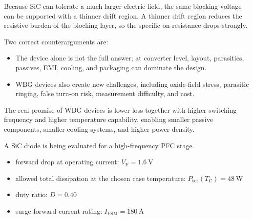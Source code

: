 \begin{solutionblock}
Because SiC can tolerate a much larger electric field, the same blocking voltage can be supported with a thinner drift region. A thinner drift region reduces the resistive burden of the blocking layer, so the specific on-resistance drops strongly.
\end{solutionblock}

\begin{solutionblock}
Two correct counterarguments are:
\begin{itemize}   
    \item The device alone is not the full answer; at converter level, layout, parasitics, passives, EMI, cooling, and packaging can dominate the design.
    \item WBG devices also create new challenges, including oxide-field stress, parasitic ringing, false turn-on risk, measurement difficulty, and cost.
\end{itemize}
\end{solutionblock}

\begin{solutionblock}
The real promise of WBG devices is lower loss together with higher switching frequency and higher temperature capability, enabling smaller passive components, smaller cooling systems, and higher power density.
\end{solutionblock}




A SiC diode is being evaluated for a high-frequency PFC stage.
\begin{itemize}
    \setlength{\itemsep}{-2pt} %
    \setlength{\parskip}{-2pt} %
    \item forward drop at operating current: $V_\mathrm{F} = \SI{1.6}{\volt}$
    \item allowed total dissipation at the chosen case temperature: $P_{\mathrm{tot}}(T_\mathrm{C}) = \SI{48}{\watt}$
    \item duty ratio: $D = 0.40$
    \item surge forward current rating: $I_\mathrm{FSM} = \SI{180}{\ampere}$
\end{itemize}

